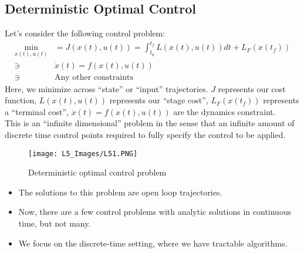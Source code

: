 \subsection{Deterministic Optimal Control}
Let's consider the following control problem:
\begin{align}
    \min_{x(t), u(t)} &= J(x(t), u(t)) = \int_{t_0}^{t_f} L(x(t), u(t)) dt + L_{F} (x(t_f)) \\
    \ni \ &\dot{x}(t) = f(x(t), u(t)) \\
    \ni \ &\textrm{Any other constraints}
\end{align}
Here, we minimize across ``state'' or ``input'' trajectories. $J$ represents our cost function, $L(x(t), u(t))$ represents our ``stage cost'', $L_{F} (x(t_f))$ represents a ``terminal cost'', $\dot{x}(t) = f(x(t), u(t))$ are the dynamics constraint. \\

\noindent
This is an ``infinite dimensional'' problem in the sense that an infinite amount of discrete time control points required to fully specify the control to be applied.
\begin{figure}[h!]
    \centering
    \texttt{[image: L5\_Images/L51.PNG]}
    \caption{Deterministic optimal control problem}
    \label{fig:l5f1}
\end{figure}
\begin{itemize}
    \item The solutions to this problem are open loop trajectories.
    \item Now, there are a few control problems with analytic solutions in continuous time, but not many.
    \item We focus on the discrete-time setting, where we have tractable algorithms.
\end{itemize}


